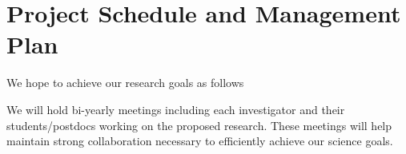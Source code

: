 \section{Project Schedule and Management Plan}

We hope to achieve our research goals as follows

We will  hold bi-yearly meetings including each investigator and their students/postdocs working on the proposed research. These meetings will help maintain strong collaboration necessary to efficiently achieve our science goals.
